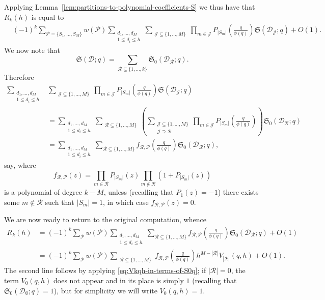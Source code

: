 \documentclass[11pt,letterpaper]{amsart}
\newcommand{\brac}[1]{\left( #1\right)}
\theoremstyle{definition}
\begin{document}
Applying Lemma~\ref{lem:partitions-to-polynomial-coefficients-S} we thus have that $R_k(h)$ is equal to
\begin{align*}
&(-1)^{k}\sum_{\mathcal P = \{S_1, \dots, S_M\}} w(\mathcal P)\sum_{\substack{d_1, \dots, d_M \\ 1 \le d_i \le h}} \sum_{\substack{\mathcal J \subseteq \{1, \dots, M\}}} \prod_{m \in \mathcal J} P_{|S_m|}\left(\frac{q}{\phi(q)}\right) \mathfrak S(\mathcal{D}_{\mathcal J};q) + O(1).
\end{align*}
We now note that
\[\mathfrak{S}(\mathcal{D};q) = \sum_{\mathcal{R}\subseteq \{1,\ldots,k\}}\mathfrak{S}_0(\mathcal{D}_{\mathcal{R}};q).\]
Therefore 
\begin{align*}
\sum_{\substack{d_1, \dots, d_M \\ 1 \le d_i \le h}} &\sum_{\substack{\mathcal J \subseteq \{1, \dots, M\}}} \prod_{m \in \mathcal J} P_{|S_m|}\left(\frac{q}{\phi(q)}\right) \mathfrak S(\mathcal{D}_{\mathcal J};q) \\
&= \sum_{\substack{d_1, \dots, d_M \\ 1 \le d_i \le h}} \sum_{\substack{\mathcal R \subseteq \{1, \dots, M\}}} \brac{\sum_{\substack{\mathcal{J}\subseteq \{1,\ldots,M\}\\ \mathcal{J}\supseteq \mathcal{R}}}\prod_{m \in \mathcal J} P_{|S_m|}\left(\frac{q}{\phi(q)}\right)}\mathfrak{S}_0(\mathcal{D}_{\mathcal R};q) \\ 
&=\sum_{\substack{d_1, \dots, d_M \\ 1\le d_i \le h}} \sum_{\mathcal R \subseteq \{1, \dots, M\}} f_{\mathcal R,\mathcal P}\left(\frac{q}{\phi(q)}\right)\mathfrak S_0(\mathcal D_{\mathcal R};q),
\end{align*}
say, where
\begin{equation*}
f_{\mathcal R,\mathcal P}(z) = \prod_{m \in \mathcal R} P_{|S_m|}(z) \prod_{m \not\in \mathcal R} \left(1+P_{|S_m|}(z)\right)
\end{equation*}
is a polynomial of degree $k-M$, unless (recalling that $P_1(z)=-1$) there exists some $m\not\in \mathcal{R}$ such that $|S_m| = 1$, in which case $f_{\mathcal R, \mathcal P}(z) = 0$.

We are now ready to return to the original computation, whence
\begin{align*}
R_k(h) &= (-1)^{k}\sum_{\mathcal P} w(\mathcal P) \sum_{\substack{d_1, \dots, d_M \\ 1\le d_i \le h}} \sum_{\mathcal R \subseteq \{1, \dots, M\}} f_{\mathcal R,\mathcal P}\left(\frac{q}{\phi(q)}\right)\mathfrak S_0(\mathcal{D}_{\mathcal R};q) + O(1) \\
&= (-1)^{k}\sum_{\mathcal P} w(\mathcal P) \sum_{\substack{\mathcal R \subseteq \{1, \dots, M\}}} f_{\mathcal R,\mathcal P}\left(\frac{q}{\phi(q)}\right) h^{M-|\mathcal R|} V_{|\mathcal R|}(q,h)  + O(1).
\end{align*}
The second line follows by applying \eqref{eq:Vkqh-in-terms-of-S0q}; if $|\mathcal R| = 0$, the term $V_0(q,h)$ does not appear and in its place is simply $1$ (recalling that $\mathfrak S_0(\mathcal D_{\emptyset};q) = 1$), but for simplicity we will write $V_0(q,h) = 1$.
\end{document}
